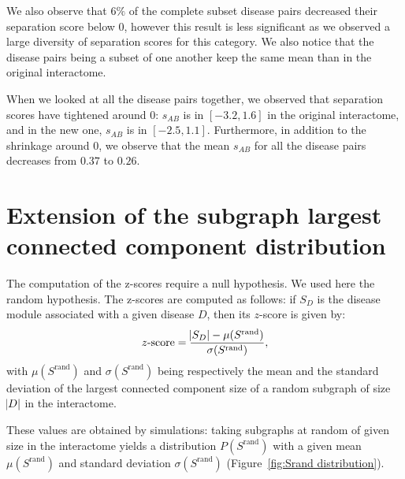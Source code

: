 \documentclass[letterpaper]{article}
\begin{document}
	We also observe that $6\%$ of the complete subset disease pairs decreased their separation score below 0,
	however this result is less significant as we observed a large diversity of separation scores for this category.
	We also notice that the disease pairs being a subset of one another keep the same mean than in the
	original interactome.

	When we looked at all the disease pairs together, we observed that separation scores have tightened around 0:
	$s_{AB}$ is in $[-3.2, 1.6]$ in the original interactome, and in the new one, $s_{AB}$ is in $[-2.5, 1.1]$.
	Furthermore, in addition to the shrinkage around 0, we observe that the mean $s_{AB}$ for all the disease
	pairs decreases from $0.37$ to $0.26$.

\section{Extension of the subgraph largest connected component distribution}
The computation of the z-scores require a null hypothesis. We used here the random hypothesis. The z-scores
are computed as follows: if $S_D$ is the disease module associated with a given disease $D$, then its
$z$-score is given by:
\begin{equation}
	z\text{-score} = \frac {\abs {S_D} - \mu(S^{\text{rand}})}{\sigma(S^{\text{rand}})},
\end{equation}
with $\mu(S^{\text{rand}})$ and $\sigma(S^{\text{rand}})$ being respectively the mean and the standard
deviation of the largest connected component size of a random subgraph of size $\abs D$ in the interactome.

These values are obtained by simulations: taking subgraphs at random of given size in the interactome yields a
distribution $P(S^{\text{rand}})$ with a given mean $\mu(S^{\text{rand}})$ and standard deviation
$\sigma(S^{\text{rand}})$ (Figure~\ref{fig:Srand distribution}).
\end{document}
